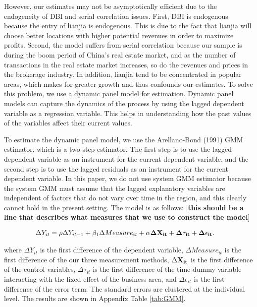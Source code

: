 \documentclass[12pt]{article}
\begin{document}
However, our estimates may not be asymptotically efficient due to the endogeneity of DBI and serial correlation issues. First, DBI is endogenous because the entry of lianjia is endogenous. This is due to the fact that lianjia will choose better locations with higher potential revenues in order to maximize profits. Second, the model suffers from serial correlation because our sample is during the boom period of China's real estate market, and as the number of transactions in the real estate market increases, so do the revenues and prices in the brokerage industry. In addition, lianjia tend to be concentrated in popular areas, which makes for greater growth and thus confounds our estimates. To solve this problem, we use a dynamic panel model for estimation. Dynamic panel models can capture the dynamics of the process by using the lagged dependent variable as a regression variable. This helps in understanding how the past values of the variables affect their current values. 

To estimate the dynamic panel model, we use the Arellano-Bond (1991) GMM estimator, which is a two-step estimator. The first step is to use the lagged dependent variable as an instrument for the current dependent variable, and the second step is to use the lagged residuals as an instrument for the current dependent variable. In this paper, we do not use system GMM estimator because the system GMM must assume that the lagged explanatory variables are independent of factors that do not vary over time in the region, and this clearly cannot hold in the present setting. The model is as follows: [\textbf{this should be a line that describes what measures that we use to construct the model}]

\begin{equation}
  \begin{aligned}
    \Delta Y_{it} & = \rho \Delta Y_{it-1} + \beta_1 \Delta Measure_{it} + \bf{\alpha} \Delta \bf{X}_{it} + \Delta \tau_{it} + \Delta \epsilon_{it}.
  \end{aligned}
\end{equation}

where $\Delta Y_{it}$ is the first difference of the dependent variable, $\Delta Measure_{it}$ is the first difference of the our three measurement methods, $\Delta \bf{X}_{it}$ is the first difference of the control variables, $\Delta \tau_{it}$ is the first difference of the time dummy variable interacting with the fixed effect of the business area, and $\Delta \epsilon_{it}$ is the first difference of the error term. The standard errors are clustered at the individual level. The results are shown in Appendix Table \ref{tab:GMM}.
\end{document}
